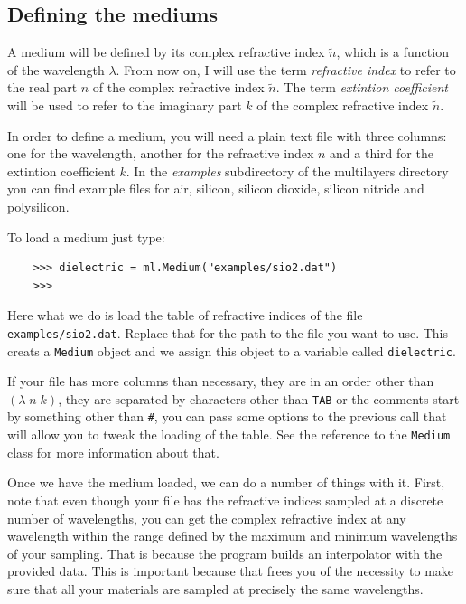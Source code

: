 \documentclass[a4paper,11pt,aps,final]{revtex4}
\begin{document}
\subsection{Defining the mediums}

A medium will be defined by its complex refractive index $\tilde n$, which is a function of the wavelength $\lambda$. From now on, I will use the term \emph{refractive index} to refer to the real part $n$ of the complex refractive index $\tilde n$. The term \emph{extintion coefficient} will be used to refer to the imaginary part $k$ of the complex refractive index $\tilde n$.

In order to define a medium, you will need a plain text file with three columns: one for the wavelength, another for the refractive index $n$ and a third for the extintion coefficient $k$. In the \emph{examples} subdirectory of the \textsf{multilayers} directory you can find example files for air, silicon, silicon dioxide, silicon nitride and polysilicon.

To load a medium just type:

\begin{verbatim}
    >>> dielectric = ml.Medium("examples/sio2.dat")
    >>>
\end{verbatim}

Here what we do is load the table of refractive indices of the file \texttt{examples/sio2.dat}. Replace that for the path to the file you want to use. This creats a \texttt{Medium} object and we assign this object to a variable called \texttt{dielectric}.

If your file has more columns than necessary, they are in an order other than $(\lambda\;n\;k)$, they are separated by characters other than \texttt{TAB} or the comments start by something other than \texttt{\#}, you can pass some options to the previous call that will allow you to tweak the loading of the table. See the reference to the \texttt{Medium} class for more information about that.

Once we have the medium loaded, we can do a number of things with it. First, note that even though your file has the refractive indices sampled at a discrete number of wavelengths, you can get the complex refractive index at any wavelength within the range defined by the maximum and minimum wavelengths of your sampling. That is because the program builds an interpolator with the provided data. This is important because that frees you of the necessity to make sure that all your materials are sampled at precisely the same wavelengths.
\end{document}
